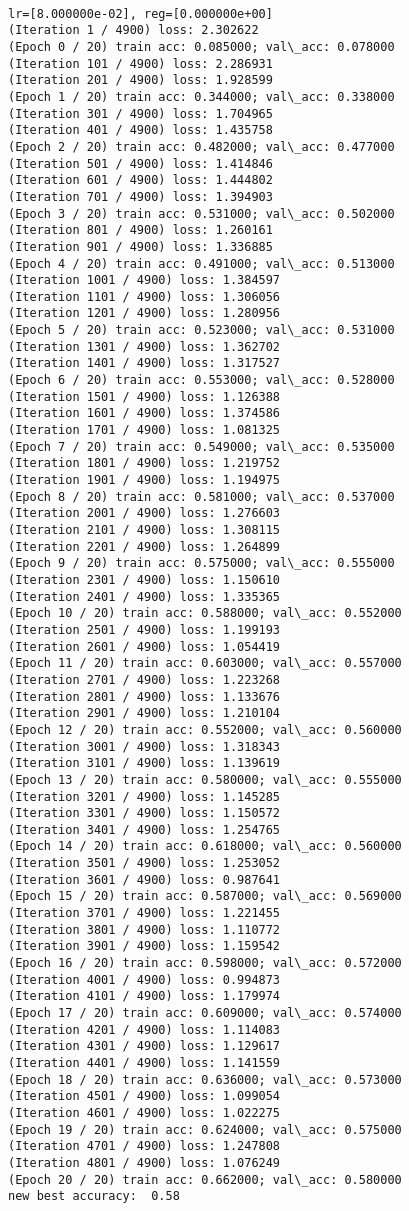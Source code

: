 \documentclass[11pt]{article}
\begin{document}
    \begin{Verbatim}[commandchars=\\\{\}]

lr=[8.000000e-02], reg=[0.000000e+00]
(Iteration 1 / 4900) loss: 2.302622
(Epoch 0 / 20) train acc: 0.085000; val\_acc: 0.078000
(Iteration 101 / 4900) loss: 2.286931
(Iteration 201 / 4900) loss: 1.928599
(Epoch 1 / 20) train acc: 0.344000; val\_acc: 0.338000
(Iteration 301 / 4900) loss: 1.704965
(Iteration 401 / 4900) loss: 1.435758
(Epoch 2 / 20) train acc: 0.482000; val\_acc: 0.477000
(Iteration 501 / 4900) loss: 1.414846
(Iteration 601 / 4900) loss: 1.444802
(Iteration 701 / 4900) loss: 1.394903
(Epoch 3 / 20) train acc: 0.531000; val\_acc: 0.502000
(Iteration 801 / 4900) loss: 1.260161
(Iteration 901 / 4900) loss: 1.336885
(Epoch 4 / 20) train acc: 0.491000; val\_acc: 0.513000
(Iteration 1001 / 4900) loss: 1.384597
(Iteration 1101 / 4900) loss: 1.306056
(Iteration 1201 / 4900) loss: 1.280956
(Epoch 5 / 20) train acc: 0.523000; val\_acc: 0.531000
(Iteration 1301 / 4900) loss: 1.362702
(Iteration 1401 / 4900) loss: 1.317527
(Epoch 6 / 20) train acc: 0.553000; val\_acc: 0.528000
(Iteration 1501 / 4900) loss: 1.126388
(Iteration 1601 / 4900) loss: 1.374586
(Iteration 1701 / 4900) loss: 1.081325
(Epoch 7 / 20) train acc: 0.549000; val\_acc: 0.535000
(Iteration 1801 / 4900) loss: 1.219752
(Iteration 1901 / 4900) loss: 1.194975
(Epoch 8 / 20) train acc: 0.581000; val\_acc: 0.537000
(Iteration 2001 / 4900) loss: 1.276603
(Iteration 2101 / 4900) loss: 1.308115
(Iteration 2201 / 4900) loss: 1.264899
(Epoch 9 / 20) train acc: 0.575000; val\_acc: 0.555000
(Iteration 2301 / 4900) loss: 1.150610
(Iteration 2401 / 4900) loss: 1.335365
(Epoch 10 / 20) train acc: 0.588000; val\_acc: 0.552000
(Iteration 2501 / 4900) loss: 1.199193
(Iteration 2601 / 4900) loss: 1.054419
(Epoch 11 / 20) train acc: 0.603000; val\_acc: 0.557000
(Iteration 2701 / 4900) loss: 1.223268
(Iteration 2801 / 4900) loss: 1.133676
(Iteration 2901 / 4900) loss: 1.210104
(Epoch 12 / 20) train acc: 0.552000; val\_acc: 0.560000
(Iteration 3001 / 4900) loss: 1.318343
(Iteration 3101 / 4900) loss: 1.139619
(Epoch 13 / 20) train acc: 0.580000; val\_acc: 0.555000
(Iteration 3201 / 4900) loss: 1.145285
(Iteration 3301 / 4900) loss: 1.150572
(Iteration 3401 / 4900) loss: 1.254765
(Epoch 14 / 20) train acc: 0.618000; val\_acc: 0.560000
(Iteration 3501 / 4900) loss: 1.253052
(Iteration 3601 / 4900) loss: 0.987641
(Epoch 15 / 20) train acc: 0.587000; val\_acc: 0.569000
(Iteration 3701 / 4900) loss: 1.221455
(Iteration 3801 / 4900) loss: 1.110772
(Iteration 3901 / 4900) loss: 1.159542
(Epoch 16 / 20) train acc: 0.598000; val\_acc: 0.572000
(Iteration 4001 / 4900) loss: 0.994873
(Iteration 4101 / 4900) loss: 1.179974
(Epoch 17 / 20) train acc: 0.609000; val\_acc: 0.574000
(Iteration 4201 / 4900) loss: 1.114083
(Iteration 4301 / 4900) loss: 1.129617
(Iteration 4401 / 4900) loss: 1.141559
(Epoch 18 / 20) train acc: 0.636000; val\_acc: 0.573000
(Iteration 4501 / 4900) loss: 1.099054
(Iteration 4601 / 4900) loss: 1.022275
(Epoch 19 / 20) train acc: 0.624000; val\_acc: 0.575000
(Iteration 4701 / 4900) loss: 1.247808
(Iteration 4801 / 4900) loss: 1.076249
(Epoch 20 / 20) train acc: 0.662000; val\_acc: 0.580000
new best accuracy:  0.58


\end{Verbatim}
\end{document}
